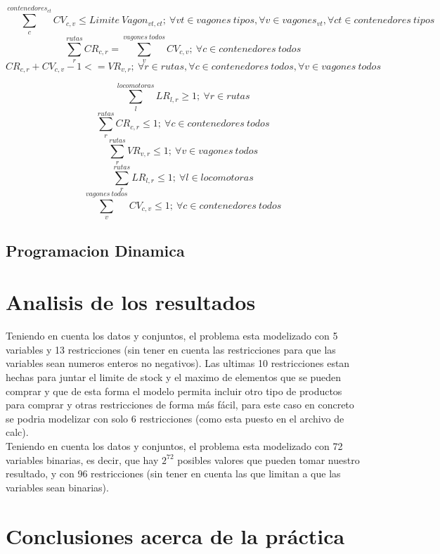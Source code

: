 \documentclass[11pt,spanish]{article}
\begin{document}
			\begin{equation}
				\sum_c^{contenedores_{ct}}CV_{c,v} \leq Limite\ Vagon_{vt,ct};\ \forall vt \in vagones\ tipos, \forall v \in vagones_{vt}, \forall ct \in contenedores\ tipos
			\end{equation}
			\begin{equation}
				\sum_r^{rutas} CR_{c,r} = \sum_v^{vagones\ todos} CV_{c,v};\ \forall c \in contenedores\ todos
			\end{equation}
			\begin{equation}
				CR_{c,r}+CV_{c,v}-1<=VR_{v,r};\ \forall r \in rutas, \forall c \in contenedores\ todos, \forall v \in vagones\ todos
			\end{equation}


			\begin{equation}
			\sum_l^{locomotoras}LR_{l,r} \geq 1;\ \forall r \in rutas
			\end{equation}
			\begin{equation}
			\sum_r^{rutas}CR_{c,r} \leq 1;\ \forall c \in contenedores\ todos
			\end{equation}
			\begin{equation}
			\sum_r^{rutas}VR_{v,r} \leq 1;\ \forall v \in vagones\ todos
			\end{equation}
			\begin{equation}
			\sum_r^{rutas} LR_{l,r} \leq 1;\ \forall l \in locomotoras
			\end{equation}
			\begin{equation}
			\sum_v^{vagones\ todos}CV_{c,v} \leq 1;\ \forall c \in contenedores\ todos
			\end{equation}
			
		\subsection{Programacion Dinamica}
	\section{Analisis de los resultados}
	Teniendo en cuenta los datos y conjuntos, el problema esta modelizado con 5 variables y 13 restricciones (sin tener en cuenta las restricciones para que las variables sean numeros enteros no negativos). Las ultimas 10 restricciones estan hechas para juntar el limite de stock y el maximo de elementos que se pueden comprar y que de esta forma el modelo permita incluir otro tipo de productos para comprar y otras restricciones de forma más fácil, para este caso en concreto se podria modelizar con solo 6 restricciones (como esta puesto en el archivo de calc).\\
	Teniendo en cuenta los datos y conjuntos, el problema esta modelizado con 72 variables binarias, es decir, que hay $2^{72}$ posibles valores que pueden tomar nuestro resultado, y con 96 restricciones (sin tener en cuenta las que limitan a que las variables sean binarias).
	\section{Conclusiones acerca de la práctica}
	\newpage
\end{document}
